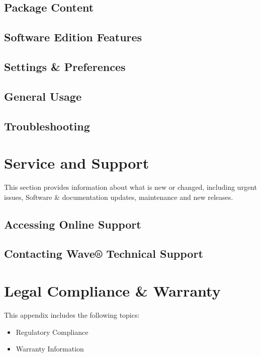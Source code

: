 \documentclass[letterpaper,10pt,english]{sphinxmanual}
\begin{document}
\section{Package Content}
\label{\detokenize{thisproduct:package-content}}

\section{Software Edition Features}
\label{\detokenize{thisproduct:software-edition-features}}

\section{Settings \& Preferences}
\label{\detokenize{thisproduct:settings-preferences}}

\section{General Usage}
\label{\detokenize{thisproduct:general-usage}}

\section{Troubleshooting}
\label{\detokenize{thisproduct:troubleshooting}}

\chapter{Service and Support}
\label{\detokenize{serviceandsupport:service-and-support}}\label{\detokenize{serviceandsupport::doc}}
This section provides information about what is new or changed, including urgent issues, Software \& documentation updates, maintenance and new releases.


\section{Accessing Online Support}
\label{\detokenize{serviceandsupport:accessing-online-support}}

\section{Contacting Wave® Technical Support}
\label{\detokenize{serviceandsupport:contacting-wave-technical-support}}

\chapter{Legal Compliance \& Warranty}
\label{\detokenize{warranty:legal-compliance-warranty}}\label{\detokenize{warranty::doc}}
This appendix includes the following topics:
\begin{itemize}
\item {} 
Regulatory Compliance

\item {} 
Warranty Information

\end{itemize}
\end{document}
